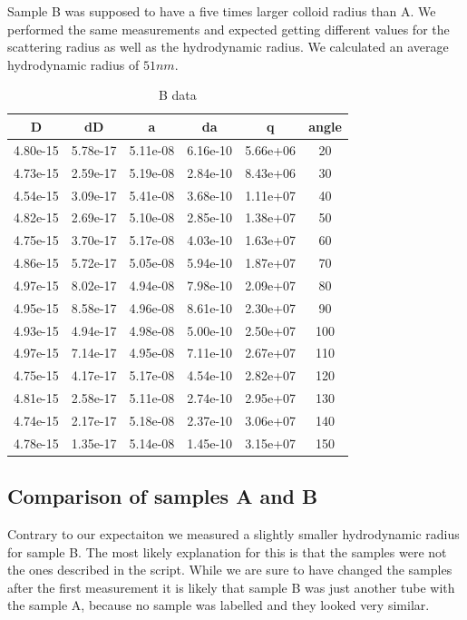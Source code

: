 \documentclass[]{article}
\begin{document}
Sample B was supposed to have a five times larger colloid radius than A. We performed the same measurements and expected getting different values for the scattering radius as well as the hydrodynamic radius. 
We calculated an average hydrodynamic radius of $51 nm$. 



\begin{table}[h]
	\centering
	\begin{tabular}{|c|c|c|c|c|c|}
		\hline
		D & dD & a & da & q & angle \\ \hline\hline
		4.80e-15 & 5.78e-17 & 5.11e-08 & 6.16e-10 & 5.66e+06 & 20 \\ \hline
		4.73e-15 & 2.59e-17 & 5.19e-08 & 2.84e-10 & 8.43e+06 & 30 \\ \hline
		4.54e-15 & 3.09e-17 & 5.41e-08 & 3.68e-10 & 1.11e+07 & 40 \\ \hline
		4.82e-15 & 2.69e-17 & 5.10e-08 & 2.85e-10 & 1.38e+07 & 50 \\ \hline
		4.75e-15 & 3.70e-17 & 5.17e-08 & 4.03e-10 & 1.63e+07 & 60 \\ \hline
		4.86e-15 & 5.72e-17 & 5.05e-08 & 5.94e-10 & 1.87e+07 & 70 \\ \hline
		4.97e-15 & 8.02e-17 & 4.94e-08 & 7.98e-10 & 2.09e+07 & 80 \\ \hline
		4.95e-15 & 8.58e-17 & 4.96e-08 & 8.61e-10 & 2.30e+07 & 90 \\ \hline
		4.93e-15 & 4.94e-17 & 4.98e-08 & 5.00e-10 & 2.50e+07 & 100 \\ \hline
		4.97e-15 & 7.14e-17 & 4.95e-08 & 7.11e-10 & 2.67e+07 & 110 \\ \hline
		4.75e-15 & 4.17e-17 & 5.17e-08 & 4.54e-10 & 2.82e+07 & 120 \\ \hline
		4.81e-15 & 2.58e-17 & 5.11e-08 & 2.74e-10 & 2.95e+07 & 130 \\ \hline
		4.74e-15 & 2.17e-17 & 5.18e-08 & 2.37e-10 & 3.06e+07 & 140 \\ \hline
		4.78e-15 & 1.35e-17 & 5.14e-08 & 1.45e-10 & 3.15e+07 & 150 \\ \hline
		\hline
	\end{tabular}
	\caption{B data}
	\label{tab:bdata}
\end{table}



\subsection{Comparison of samples A and B}
Contrary to our expectaiton we measured a slightly smaller hydrodynamic radius for sample B. The most likely explanation for this is that the samples were not the ones described in the script. While we are sure to have changed the samples after the first measurement it is likely that sample B was just another tube with the sample A, because no sample was labelled and they looked very similar.
\end{document}
